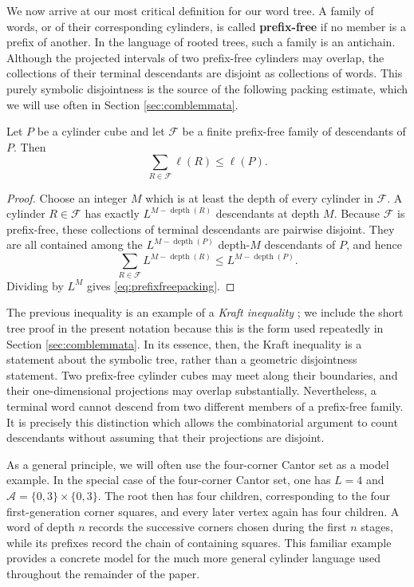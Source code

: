 \documentclass[12pt]{amsart}
\numberwithin{equation}{section}
\begin{document}
We now arrive at our most critical definition for our word tree. A family of words, or of their corresponding cylinders, is called \textbf{prefix-free} if no member is a prefix of another. In the language of rooted trees, such a family is an antichain. Although the projected intervals of two prefix-free cylinders may overlap, the collections of their terminal descendants are disjoint as collections of words. This purely symbolic disjointness is the source of the following packing estimate, which we will use often in Section \ref{sec:comblemmata}.

\begin{lemma}\label{lma:prefixfreepacking}
Let $P$ be a cylinder cube and let $\mathscr F$ be a finite prefix-free family of descendants of $P$. Then
\begin{equation}\label{eq:prefixfreepacking}
\sum_{R\in\mathscr F}\ell(R)\leq\ell(P).
\end{equation}
\end{lemma}

\begin{proof}
Choose an integer $M$ which is at least the depth of every cylinder in $\mathscr F$. A cylinder $R\in\mathscr F$ has exactly $L^{M-\operatorname{depth}(R)}$ descendants at depth $M$. Because $\mathscr F$ is prefix-free, these collections of terminal descendants are pairwise disjoint. They are all contained among the $L^{M-\operatorname{depth}(P)}$ depth-$M$ descendants of $P$, and hence
$$
\sum_{R\in\mathscr F}L^{M-\operatorname{depth}(R)}
\leq L^{M-\operatorname{depth}(P)}.
$$
Dividing by $L^M$ gives \eqref{eq:prefixfreepacking}.
\end{proof}

The previous inequality is an example of a \textit{Kraft inequality} \cite{Kraft}; we include the short tree proof in the present notation because this is the form used repeatedly in Section \ref{sec:comblemmata}. In its essence, then, the Kraft inequality is a statement about the symbolic tree, rather than a geometric disjointness statement. Two prefix-free cylinder cubes may meet along their boundaries, and their one-dimensional projections may overlap substantially. Nevertheless, a terminal word cannot descend from two different members of a prefix-free family. It is precisely this distinction which allows the combinatorial argument to count descendants without assuming that their projections are disjoint.

As a general principle, we will often use the four-corner Cantor set as a model example. In the special case of the four-corner Cantor set, one has $L=4$ and $\mathcal A=\{0,3\}\times\{0,3\}$. The root then has four children, corresponding to the four first-generation corner squares, and every later vertex again has four children. A word of depth $n$ records the successive corners chosen during the first $n$ stages, while its prefixes record the chain of containing squares. This familiar example provides a concrete model for the much more general cylinder language used throughout the remainder of the paper.
\end{document}
